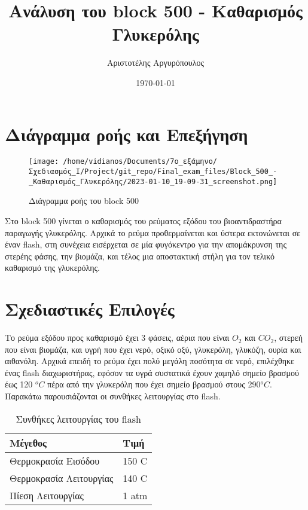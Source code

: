 \documentclass[11pt]{article}
\author{Αριστοτέλης Αργυρόπουλος}
\date{\today}
\title{Ανάλυση του block 500 - Καθαρισμός Γλυκερόλης}
\begin{document}
\maketitle
\tableofcontents

\renewcommand{\abstractname}{Περίληψη}
\renewcommand{\tablename}{Πίνακας}
\renewcommand{\figurename}{Σχήμα}
\renewcommand\listingscaption{Κώδικας}

\section{Διάγραμμα ροής και Επεξήγηση}
\label{sec:org47a5343}
\begin{figure}[htbp]
\centering
\texttt{[image: /home/vidianos/Documents/7o\_εξάμηνο/Σχεδιασμός\_Ι/Project/git\_repo/Final\_exam\_files/Block\_500\_-\_Καθαρισμός\_Γλυκερόλης/2023-01-10\_19-09-31\_screenshot.png]}
\caption{Διάγραμμα ροής του block 500}
\end{figure}

Στο block 500 γίνεται ο καθαρισμός του ρεύματος εξόδου του
βιοαντιδραστήρα παραγωγής γλυκερόλης. Αρχικά το ρεύμα προθερμαίνεται
και ύστερα εκτονώνεται σε έναν flash, στη συνέχεια εισέρχεται σε μία
φυγόκεντρο για την απομάκρυνση της στερέης φάσης, την βιομάζα, και τέλος
μια αποστακτική στήλη για τον τελικό καθαρισμό της γλυκερόλης.

\section{Σχεδιαστικές Επιλογές}
\label{sec:org8dd060e}
Το ρεύμα εξόδου προς καθαρισμό έχει 3 φάσεις, αέρια που είναι \(O_2\)
και \(CO_2\), στερεή που είναι βιομάζα, και υγρή που έχει νερό, οξικό
οξύ, γλυκερόλη, γλυκόζη, ουρία και αιθανόλη. Αρχικά επειδή το ρεύμα
έχει πολύ μεγάλη ποσότητα σε νερό, επιλέχθηκε ένας flash διαχωριστήρας,
εφόσον τα υγρά συστατικά έχουν χαμηλό σημείο βρασμού έως 120 \(^{o} C\)
πέρα από την γλυκερόλη που έχει σημείο βρασμού στους 290\(^{o} C\).
Παρακάτω παρουσιάζονται οι συνθήκες λειτουργίας στο flash.

\begin{table}[htbp]
\caption{Συνθήκες λειτουργίας του flash}
\centering
\begin{tabular}{ll}
Μέγεθος & Τιμή\\
\hline
Θερμοκρασία Εισόδου & 150 C\\
Θερμοκρασία Λειτουργίας & 140 C\\
Πίεση Λειτουργίας & 1 atm\\
\end{tabular}
\end{table}
\end{document}
